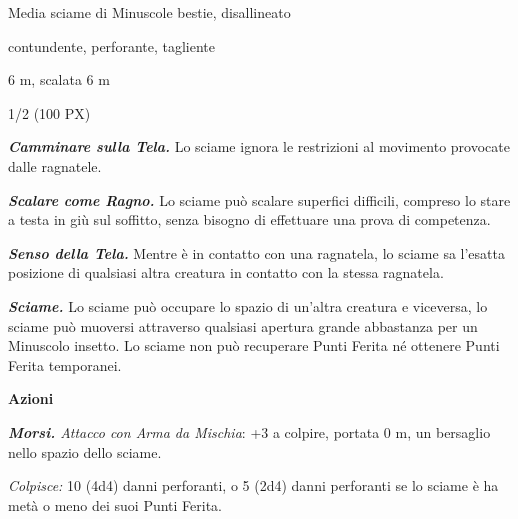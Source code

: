 \begin{multicols}{2}
{
\begin{description}[noitemsep, topsep=0pt, parsep=0pt, partopsep=0pt, itemsep=1pt, leftmargin=2.35cm,  labelwidth=2.2cm, itemindent=0cm, listparindent=0pt] %
\setlength{\baselineskip}{10pt}
\item[\textbf{Taglia/Tipo}] Media sciame di Minuscole bestie, disallineato
\item[\textbf{Caratt.}] 
\item[\textbf{Punti Ferita}] 
\item[\textbf{Resistenze al danno}] contundente, perforante, tagliente
\item[\textbf{Tiri Salvez.}] 
\item[\textbf{Movimento}] 6 m, scalata 6 m
\item[\textbf{Sfida}] 1/2 (100 PX)
\end{description}
\smallskip

\emph{\textbf{Camminare sulla Tela.}} Lo sciame ignora le restrizioni al movimento provocate dalle ragnatele.

\emph{\textbf{Scalare come Ragno.}} Lo sciame può scalare superfici difficili, compreso lo stare a testa in giù sul soffitto, senza bisogno di effettuare una prova di competenza.

\emph{\textbf{Senso della Tela.}} Mentre è in contatto con una ragnatela, lo sciame sa l'esatta posizione di qualsiasi altra creatura in contatto con la stessa ragnatela.

\emph{\textbf{Sciame.}} Lo sciame può occupare lo spazio di un'altra creatura e viceversa, lo sciame può muoversi attraverso qualsiasi apertura grande abbastanza per un Minuscolo insetto. Lo sciame non può recuperare Punti Ferita né ottenere Punti Ferita temporanei.

\textbf{Azioni}

\emph{\textbf{Morsi.} Attacco con Arma da Mischia}: +3 a colpire, portata 0 m, un bersaglio nello spazio dello sciame.

\emph{Colpisce:} 10 (4d4) danni perforanti, o 5 (2d4) danni perforanti se lo sciame è ha metà o meno dei suoi Punti Ferita.

}
\end{multicols}
